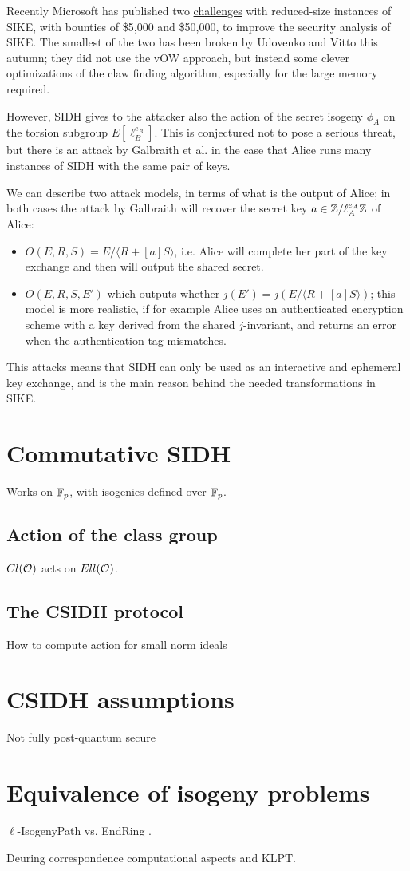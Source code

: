 Recently Microsoft has published two \href{https://www.microsoft.com/en-us/msrc/sike-cryptographic-challenge}{challenges} with reduced-size instances of SIKE, with bounties of \$5,000 and \$50,000, to improve the security analysis of SIKE. The smallest of the two has been broken by Udovenko and Vitto \cite{SIKE_challenge} this autumn; they did not use the vOW approach, but instead some clever optimizations of the claw finding algorithm, especially for the large memory required.


However, SIDH gives to the attacker also the action of the secret isogeny $\phi_A$ on the torsion subgroup $E[\ell_B^{e_B}]$. This is conjectured not to pose a serious threat, but there is an attack by Galbraith et al. \cite{Galbraith_SIKE} in the case that Alice runs many instances of SIDH with the same pair of keys.

We can describe two attack models, in terms of what is the output of Alice; in both cases the attack by Galbraith will recover the secret key $a\in\mathbb{Z}/\ell_A^{e_A}\mathbb{Z}$ of Alice:
\begin{itemize}
    \item $O(E,R,S)=E/\langle R+[a]S\rangle$, i.e. Alice will complete her part of the key exchange and then will output the shared secret.
    \item $O(E,R,S,E')$ which outputs whether $j(E')=j(E/\langle R+[a]S\rangle)$; this model is more realistic, if for example Alice uses an authenticated encryption scheme with a key derived from the shared $j$-invariant, and returns an error when the authentication tag mismatches.
\end{itemize}

This attacks means that SIDH can only be used as an interactive and ephemeral key exchange, and is the main reason behind the needed transformations in SIKE.

\section{Commutative SIDH}
Works on $\mathbb{F}_p$, with isogenies defined over $\mathbb{F}_p$.

\subsection{Action of the class group}
$Cl(\mathcal{O})$ acts on $Ell(\mathcal{O})$.

\subsection{The CSIDH protocol}
How to compute action for small norm ideals

\section{CSIDH assumptions}
Not fully post-quantum secure

\cite{breaking_DDH}

\section{Equivalence of isogeny problems}
$\ell$-IsogenyPath vs. EndRing \cite{Weso_EndRing}.

Deuring correspondence computational aspects and KLPT.

\cite{Weso_CSIDH}
